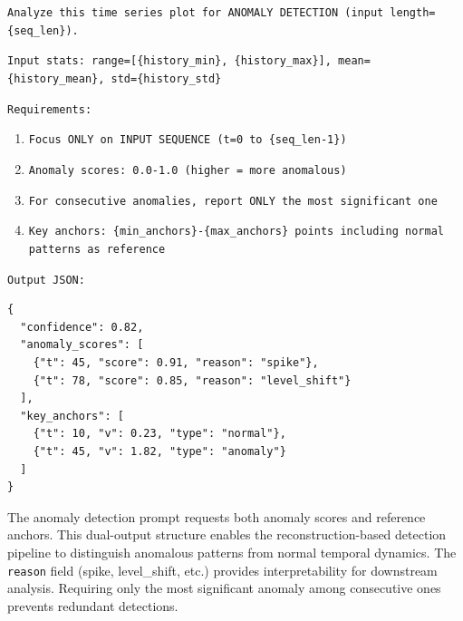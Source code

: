 \begin{tcolorbox}[colback=red!5, colframe=red!30, title=User Prompt Template (Anomaly Detection)]
\small
\texttt{Analyze this time series plot for ANOMALY DETECTION (input length=\{seq\_len\}).}

\texttt{Input stats: range=[\{history\_min\}, \{history\_max\}], mean=\{history\_mean\}, std=\{history\_std\}}

\texttt{Requirements:}
\begin{enumerate}[leftmargin=*, itemsep=0pt]
    \item \texttt{Focus ONLY on INPUT SEQUENCE (t=0 to \{seq\_len-1\})}
    \item \texttt{Anomaly scores: 0.0-1.0 (higher = more anomalous)}
    \item \texttt{For consecutive anomalies, report ONLY the most significant one}
    \item \texttt{Key anchors: \{min\_anchors\}-\{max\_anchors\} points including normal patterns as reference}
\end{enumerate}

\texttt{Output JSON:}
\begin{verbatim}
{
  "confidence": 0.82,
  "anomaly_scores": [
    {"t": 45, "score": 0.91, "reason": "spike"},
    {"t": 78, "score": 0.85, "reason": "level_shift"}
  ],
  "key_anchors": [
    {"t": 10, "v": 0.23, "type": "normal"},
    {"t": 45, "v": 1.82, "type": "anomaly"}
  ]
}
\end{verbatim}
\end{tcolorbox}

The anomaly detection prompt requests both anomaly scores and reference anchors. This dual-output structure enables the reconstruction-based detection pipeline to distinguish anomalous patterns from normal temporal dynamics. The \texttt{reason} field (spike, level\_shift, etc.) provides interpretability for downstream analysis. Requiring only the most significant anomaly among consecutive ones prevents redundant detections.


\newpage
